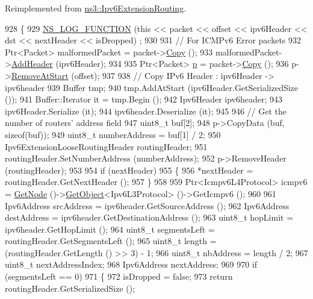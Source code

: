 Reimplemented from \hyperlink{classns3_1_1Ipv6ExtensionRouting_afa441177f8a75d9683e826e5417b1a98}{ns3\+::\+Ipv6\+Extension\+Routing}.


\begin{DoxyCode}
928 \{
929   \hyperlink{log-macros-disabled_8h_a90b90d5bad1f39cb1b64923ea94c0761}{NS\_LOG\_FUNCTION} (\textcolor{keyword}{this} << packet << offset << ipv6Header << dst << nextHeader << isDropped)
      ;
930 
931   \textcolor{comment}{// For ICMPv6 Error packets}
932   Ptr<Packet> malformedPacket = packet->\hyperlink{classns3_1_1Packet_a5d5c70802a5f77fc5f0001e0cfc1898b}{Copy} ();
933   malformedPacket->\hyperlink{classns3_1_1Packet_a465108c595a0bc592095cbcab1832ed8}{AddHeader} (ipv6Header);
934 
935   Ptr<Packet> \hyperlink{lte__link__budget_8m_ac9de518908a968428863f829398a4e62}{p} = packet->\hyperlink{classns3_1_1Packet_a5d5c70802a5f77fc5f0001e0cfc1898b}{Copy} ();
936   p->\hyperlink{classns3_1_1Packet_a78aa207e7921dd2f9f7e0d0b7a1c730a}{RemoveAtStart} (offset);
937 
938   \textcolor{comment}{// Copy IPv6 Header : ipv6Header -> ipv6header}
939   Buffer tmp;
940   tmp.AddAtStart (ipv6Header.GetSerializedSize ());
941   Buffer::Iterator it = tmp.Begin ();
942   Ipv6Header ipv6header;
943   ipv6Header.Serialize (it);
944   ipv6header.Deserialize (it);
945 
946   \textcolor{comment}{// Get the number of routers' address field}
947   uint8\_t buf[2];
948   p->CopyData (buf, \textcolor{keyword}{sizeof}(buf));
949   uint8\_t numberAddress = buf[1] / 2;
950   Ipv6ExtensionLooseRoutingHeader routingHeader;
951   routingHeader.SetNumberAddress (numberAddress);
952   p->RemoveHeader (routingHeader);
953 
954   \textcolor{keywordflow}{if} (nextHeader)
955     \{
956       *nextHeader = routingHeader.GetNextHeader ();
957     \}
958 
959   Ptr<Icmpv6L4Protocol> icmpv6 = \hyperlink{classns3_1_1Ipv6Extension_a71cc2e202ef7605b1f645d8c6a384657}{GetNode} ()->\hyperlink{classns3_1_1Object_a13e18c00017096c8381eb651d5bd0783}{GetObject}<Ipv6L3Protocol> ()->GetIcmpv6 ();
960 
961   Ipv6Address srcAddress = ipv6header.GetSourceAddress ();
962   Ipv6Address destAddress = ipv6header.GetDestinationAddress ();
963   uint8\_t hopLimit = ipv6header.GetHopLimit ();
964   uint8\_t segmentsLeft = routingHeader.GetSegmentsLeft ();
965   uint8\_t length = (routingHeader.GetLength () >> 3) - 1;
966   uint8\_t nbAddress = length / 2;
967   uint8\_t nextAddressIndex;
968   Ipv6Address nextAddress;
969 
970   \textcolor{keywordflow}{if} (segmentsLeft == 0)
971     \{
972       isDropped = \textcolor{keyword}{false};
973       \textcolor{keywordflow}{return} routingHeader.GetSerializedSize ();

\end{DoxyCode}
